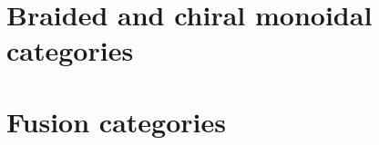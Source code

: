         \minitoc
        
        
        
        
    
    \chapter{Braided and chiral monoidal categories}
        \begin{abstract}
            
        \end{abstract}
        
        \minitoc
        
        
        
        
    
    \chapter{Fusion categories}
        \begin{abstract}
            
        \end{abstract}
        
        \minitoc
        
        
        
        
        
        
    
